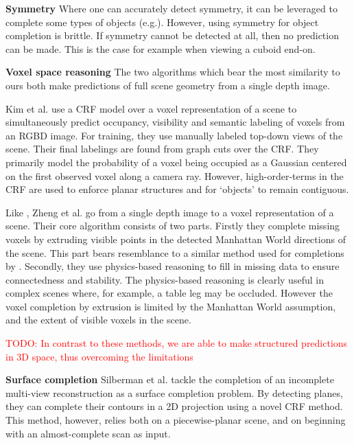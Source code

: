 \documentclass[10pt,twocolumn,letterpaper]{article}
\makeatletter
\renewcommand*{\eg}{e.g.\@\xspace}
\newcommand*{\ea}{et al.\@\xspace}
\newcommand{\todo}[1]{\textcolor{red}{TODO: #1}}
\makeatother
\begin{document}
\noindent\textbf{Symmetry}
Where one can accurately detect symmetry, it can be leveraged to complete some types of objects (\eg \cite{law-cviu-2010, thrun-iccv-2005, kroemer-humanoids-2012}). 
However, using symmetry for object completion is brittle.
If symmetry cannot be detected at all, then no prediction can be made.
This is the case for example when viewing a cuboid end-on.


\noindent\textbf{Voxel space reasoning}
The two algorithms which bear the most similarity to ours both make predictions of full scene geometry from a single depth image.

Kim \ea \cite{kim-iccv-2013} use a CRF model over a voxel representation of a scene to simultaneously predict occupancy, visibility and semantic labeling of voxels from an RGBD image. 
For training, they use manually labeled top-down views of the scene.
Their final labelings are found from graph cuts over the CRF.
They primarily model the probability of a voxel being occupied as a Gaussian centered on the first observed voxel along a camera ray.
However, high-order-terms in the CRF are used to enforce planar structures and for `objects' to remain contiguous.

Like \cite{kim-iccv-2013},  Zheng \ea \cite{zheng-cvpr-2013} go from a single depth image to a voxel representation of a scene.
Their core algorithm consists of two parts.
Firstly they complete missing voxels by extruding visible points in the detected Manhattan World directions of the scene.
This part bears resemblance to a similar method used for completions by \cite{kroemer-humanoids-2012}.
Secondly, they use physics-based reasoning to fill in missing data to ensure connectedness and stability.
The physics-based reasoning is clearly useful in complex scenes where, for example, a table leg may be occluded.
However the voxel completion by extrusion is limited by the Manhattan World assumption, and the extent of visible voxels in the scene.

\todo{In contrast to these methods, we are able to  make structured predictions in 3D space, thus overcoming the limitations}


\noindent\textbf{Surface completion}
Silberman \ea \cite{silberman-eccv-2014} tackle the completion of an incomplete multi-view reconstruction as a surface completion problem.
By detecting planes, they can complete their contours in a 2D projection using a novel CRF method.
This method, however, relies both on a piecewise-planar scene, and on beginning with an almost-complete scan as input.
\end{document}
